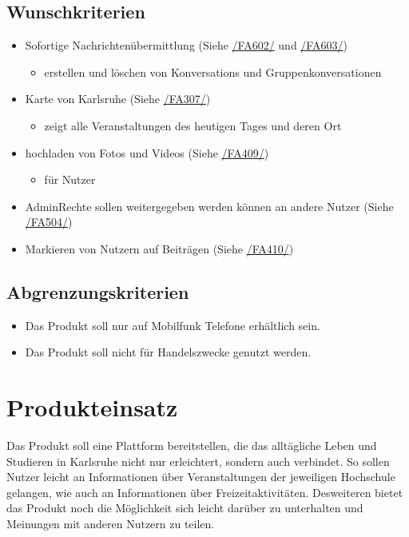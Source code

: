 \documentclass[parskip=full]{scrartcl}
\begin{document}
		\subsection{Wunschkriterien}
		\begin{itemize}[nosep] 
			\item Sofortige Nachrichtenübermittlung (Siehe \hyperref[sec:FA602]{/FA602/} und \hyperref[sec:FA603]{/FA603/})
			\begin{itemize}
				\item erstellen und löschen von \glspl{Konversation} und Gruppenkonversationen
			\end{itemize}
			
			\item Karte von Karlsruhe (Siehe \hyperref[sec:FA307]{/FA307/})
			\begin{itemize}
				\item zeigt alle Veranstaltungen des heutigen Tages und deren Ort
			\end{itemize}
			\item hochladen von Fotos und Videos (Siehe \hyperref[sec:FA409]{/FA409/})
			\begin{itemize}
				\item für Nutzer
			\end{itemize}
			\item \gls{AdminRechte} sollen weitergegeben werden können an andere Nutzer 
			(Siehe \hyperref[sec:FA504]{/FA504/})
			\item Markieren von Nutzern auf Beiträgen (Siehe \hyperref[sec:FA410]{/FA410/})
		\end{itemize}
		
		\newpage
		\subsection{Abgrenzungskriterien}
		\begin{itemize}
			\item Das Produkt soll nur auf Mobilfunk Telefone erhältlich sein.
			\item Das Produkt soll nicht für Handelszwecke genutzt werden.
		\end{itemize}
		\newpage
		
		
		\section{Produkteinsatz}
		Das Produkt soll eine Plattform bereitstellen, die das alltägliche Leben und Studieren in Karlsruhe nicht nur erleichtert, sondern auch verbindet. So sollen Nutzer leicht an Informationen über Veranstaltungen der jeweiligen Hochschule gelangen, wie auch an Informationen über Freizeitaktivitäten. Desweiteren bietet das Produkt noch die Möglichkeit sich leicht darüber zu unterhalten und Meinungen mit anderen Nutzern zu teilen.
		
\end{document}
